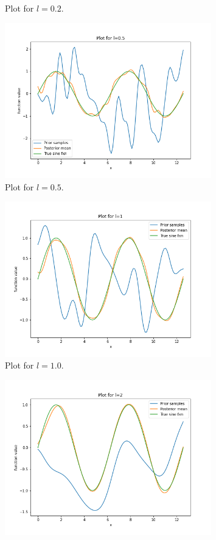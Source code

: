 \documentclass[a4paper,11pt]{article}
\begin{document}
\begin{pmisolution}
\begin{figure}[h]
\caption{Plot for \(l=0.2\).} 
\label{fig:q4_02}
\end{figure}
\begin{figure}[h]
\centering
\includegraphics[height=2.65in]{question_4_0.5.png}
\caption{Plot for \(l=0.5\).} 
\label{fig:q4_05}
\end{figure}
\begin{figure}[h]
\centering
\includegraphics[height=2.65in]{question_4_1.png}
\caption{Plot for \(l=1.0\).} 
\label{fig:q4_1}
\end{figure}
\begin{figure}[h]
\centering
\includegraphics[height=2.65in]{question_4_2.png}

\end{figure}
\end{pmisolution}
\end{document}
